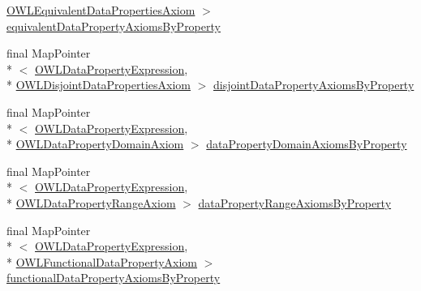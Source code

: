 \begin{DoxyCompactItemize}
\hyperlink{interfaceorg_1_1semanticweb_1_1owlapi_1_1model_1_1_o_w_l_equivalent_data_properties_axiom}{O\-W\-L\-Equivalent\-Data\-Properties\-Axiom} $>$ \hyperlink{classuk_1_1ac_1_1manchester_1_1cs_1_1owl_1_1owlapi_1_1_abstract_internals_impl_a604653413528dc036f988b6d3e603bc7}{equivalent\-Data\-Property\-Axioms\-By\-Property}
\item 
final Map\-Pointer\\*
$<$ \hyperlink{interfaceorg_1_1semanticweb_1_1owlapi_1_1model_1_1_o_w_l_data_property_expression}{O\-W\-L\-Data\-Property\-Expression}, \\*
\hyperlink{interfaceorg_1_1semanticweb_1_1owlapi_1_1model_1_1_o_w_l_disjoint_data_properties_axiom}{O\-W\-L\-Disjoint\-Data\-Properties\-Axiom} $>$ \hyperlink{classuk_1_1ac_1_1manchester_1_1cs_1_1owl_1_1owlapi_1_1_abstract_internals_impl_adb9089e9391c3964747a39fa76d4da4e}{disjoint\-Data\-Property\-Axioms\-By\-Property}
\item 
final Map\-Pointer\\*
$<$ \hyperlink{interfaceorg_1_1semanticweb_1_1owlapi_1_1model_1_1_o_w_l_data_property_expression}{O\-W\-L\-Data\-Property\-Expression}, \\*
\hyperlink{interfaceorg_1_1semanticweb_1_1owlapi_1_1model_1_1_o_w_l_data_property_domain_axiom}{O\-W\-L\-Data\-Property\-Domain\-Axiom} $>$ \hyperlink{classuk_1_1ac_1_1manchester_1_1cs_1_1owl_1_1owlapi_1_1_abstract_internals_impl_aa5ed486038f750b54814572c6ea549ce}{data\-Property\-Domain\-Axioms\-By\-Property}
\item 
final Map\-Pointer\\*
$<$ \hyperlink{interfaceorg_1_1semanticweb_1_1owlapi_1_1model_1_1_o_w_l_data_property_expression}{O\-W\-L\-Data\-Property\-Expression}, \\*
\hyperlink{interfaceorg_1_1semanticweb_1_1owlapi_1_1model_1_1_o_w_l_data_property_range_axiom}{O\-W\-L\-Data\-Property\-Range\-Axiom} $>$ \hyperlink{classuk_1_1ac_1_1manchester_1_1cs_1_1owl_1_1owlapi_1_1_abstract_internals_impl_abec29ad2cb4d4f327268abfcc20512eb}{data\-Property\-Range\-Axioms\-By\-Property}
\item 
final Map\-Pointer\\*
$<$ \hyperlink{interfaceorg_1_1semanticweb_1_1owlapi_1_1model_1_1_o_w_l_data_property_expression}{O\-W\-L\-Data\-Property\-Expression}, \\*
\hyperlink{interfaceorg_1_1semanticweb_1_1owlapi_1_1model_1_1_o_w_l_functional_data_property_axiom}{O\-W\-L\-Functional\-Data\-Property\-Axiom} $>$ \hyperlink{classuk_1_1ac_1_1manchester_1_1cs_1_1owl_1_1owlapi_1_1_abstract_internals_impl_a368fa68dc04ec102a6cef2d2343f8ae6}{functional\-Data\-Property\-Axioms\-By\-Property}

\end{DoxyCompactItemize}
